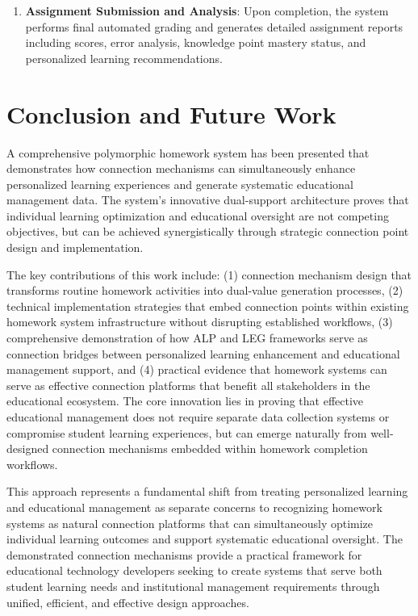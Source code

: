 \documentclass[conference]{IEEEtran}
\begin{document}
\begin{IEEEkeywords}
\begin{enumerate}
\item \textbf{Assignment Submission and Analysis}: Upon completion, the system performs final automated grading and generates detailed assignment reports including scores, error analysis, knowledge point mastery status, and personalized learning recommendations.
\end{enumerate}







\section{Conclusion and Future Work}

A comprehensive polymorphic homework system has been presented that demonstrates how connection mechanisms can simultaneously enhance personalized learning experiences and generate systematic educational management data. The system's innovative dual-support architecture proves that individual learning optimization and educational oversight are not competing objectives, but can be achieved synergistically through strategic connection point design and implementation.

The key contributions of this work include: (1) connection mechanism design that transforms routine homework activities into dual-value generation processes, (2) technical implementation strategies that embed connection points within existing homework system infrastructure without disrupting established workflows, (3) comprehensive demonstration of how ALP and LEG frameworks serve as connection bridges between personalized learning enhancement and educational management support, and (4) practical evidence that homework systems can serve as effective connection platforms that benefit all stakeholders in the educational ecosystem. The core innovation lies in proving that effective educational management does not require separate data collection systems or compromise student learning experiences, but can emerge naturally from well-designed connection mechanisms embedded within homework completion workflows.

This approach represents a fundamental shift from treating personalized learning and educational management as separate concerns to recognizing homework systems as natural connection platforms that can simultaneously optimize individual learning outcomes and support systematic educational oversight. The demonstrated connection mechanisms provide a practical framework for educational technology developers seeking to create systems that serve both student learning needs and institutional management requirements through unified, efficient, and effective design approaches.


\end{IEEEkeywords}
\end{document}
